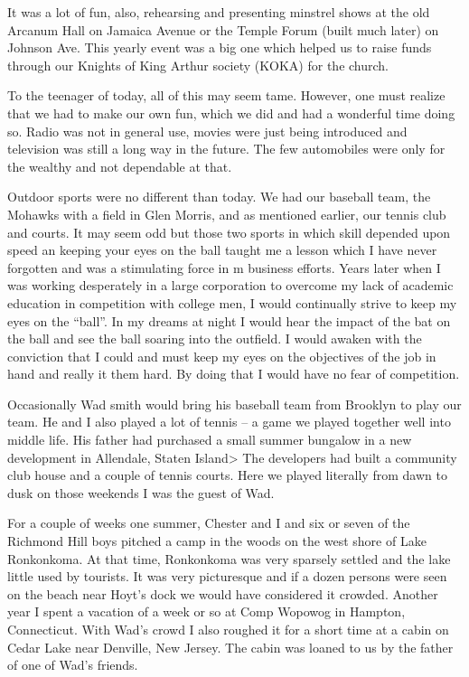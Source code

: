 \documentclass[12pt]{book}              %
\begin{document}
It was a lot of fun, also, rehearsing and presenting minstrel shows at the old Arcanum Hall on Jamaica Avenue or the Temple Forum (built much later) on Johnson Ave. This yearly event was a big one which helped us to raise funds through our Knights of King Arthur society (KOKA) for the church.

To the teenager of today, all of this may seem tame. However, one must realize that we had to make our own fun, which we did and had a wonderful time doing so. Radio was not in general use, movies were just being introduced and television was still a long way in the future. The few automobiles were only for the wealthy and not dependable at that.

Outdoor sports were no different than today. We had our baseball team, the Mohawks with a field in Glen Morris, and as mentioned earlier, our tennis club and courts. It may seem odd but those two sports in which skill depended upon speed an keeping your eyes on the ball taught me a lesson which I have never forgotten and was a stimulating force in m business efforts. Years later when I was working desperately in a large corporation to overcome my lack of academic education in competition with college men, I would continually strive to keep my eyes on the ``ball''. In my dreams at night I would hear the impact of the bat on the ball and see the ball soaring into the outfield. I would awaken with the conviction that I could and must keep my eyes on the objectives of the job in hand and really it them hard. By doing that I would have no fear of competition. 

Occasionally Wad smith would bring his baseball team from Brooklyn to play our team. He and I also played a lot of tennis -- a game we played together well into middle life. His father had purchased a small summer bungalow in a new development in Allendale, Staten Island> The developers had built a community club house and a couple of tennis courts. Here we played literally from dawn to dusk on those weekends I was the guest of Wad.

For a couple of weeks one summer, Chester and I and six or seven of the Richmond Hill boys pitched a camp in the woods on the west shore of Lake Ronkonkoma. At that time, Ronkonkoma was very sparsely settled and the lake little used by tourists. It was very picturesque and if a dozen persons were seen on the beach near Hoyt's dock we would have considered it crowded. Another year I spent a vacation of a week or so at Comp Wopowog in Hampton, Connecticut. With Wad's crowd I also roughed it for a short time at a cabin on Cedar Lake near Denville, New Jersey. The cabin was loaned to us by the father of one of Wad's friends. 
\end{document}

